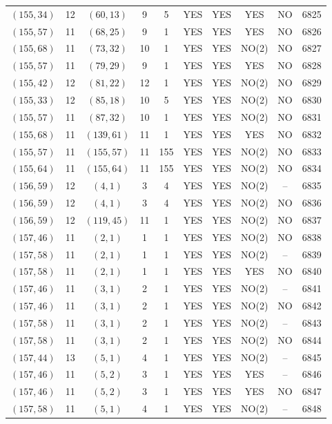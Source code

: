 \begin{longtable}{|c|c|c|c|c|c|c|c|c|c|}
$(155, 34)$ & 12 & $(60, 13)$ & 9 & 5 & YES & YES & YES & NO & 6825\\
$(155, 57)$ & 11 & $(68, 25)$ & 9 & 1 & YES & YES & YES & NO & 6826\\
$(155, 68)$ & 11 & $(73, 32)$ & 10 & 1 & YES & YES & NO(2) & NO & 6827\\
$(155, 57)$ & 11 & $(79, 29)$ & 9 & 1 & YES & YES & YES & NO & 6828\\
$(155, 42)$ & 12 & $(81, 22)$ & 12 & 1 & YES & YES & NO(2) & NO & 6829\\
$(155, 33)$ & 12 & $(85, 18)$ & 10 & 5 & YES & YES & NO(2) & NO & 6830\\
$(155, 57)$ & 11 & $(87, 32)$ & 10 & 1 & YES & YES & NO(2) & NO & 6831\\
$(155, 68)$ & 11 & $(139, 61)$ & 11 & 1 & YES & YES & YES & NO & 6832\\
$(155, 57)$ & 11 & $(155, 57)$ & 11 & 155 & YES & YES & NO(2) & NO & 6833\\
$(155, 64)$ & 11 & $(155, 64)$ & 11 & 155 & YES & YES & NO(2) & NO & 6834\\
$(156, 59)$ & 12 & $(4, 1)$ & 3 & 4 & YES & YES & NO(2) & -- & 6835\\
$(156, 59)$ & 12 & $(4, 1)$ & 3 & 4 & YES & YES & NO(2) & NO & 6836\\
$(156, 59)$ & 12 & $(119, 45)$ & 11 & 1 & YES & YES & NO(2) & NO & 6837\\
$(157, 46)$ & 11 & $(2, 1)$ & 1 & 1 & YES & YES & NO(2) & NO & 6838\\
$(157, 58)$ & 11 & $(2, 1)$ & 1 & 1 & YES & YES & NO(2) & -- & 6839\\
$(157, 58)$ & 11 & $(2, 1)$ & 1 & 1 & YES & YES & YES & NO & 6840\\
$(157, 46)$ & 11 & $(3, 1)$ & 2 & 1 & YES & YES & NO(2) & -- & 6841\\
$(157, 46)$ & 11 & $(3, 1)$ & 2 & 1 & YES & YES & NO(2) & NO & 6842\\
$(157, 58)$ & 11 & $(3, 1)$ & 2 & 1 & YES & YES & NO(2) & -- & 6843\\
$(157, 58)$ & 11 & $(3, 1)$ & 2 & 1 & YES & YES & NO(2) & NO & 6844\\
$(157, 44)$ & 13 & $(5, 1)$ & 4 & 1 & YES & YES & NO(2) & -- & 6845\\
$(157, 46)$ & 11 & $(5, 2)$ & 3 & 1 & YES & YES & YES & -- & 6846\\
$(157, 46)$ & 11 & $(5, 2)$ & 3 & 1 & YES & YES & YES & NO & 6847\\
$(157, 58)$ & 11 & $(5, 1)$ & 4 & 1 & YES & YES & NO(2) & -- & 6848\\

\end{longtable}
